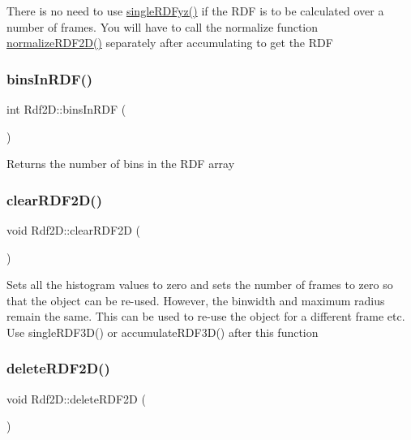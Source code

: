 There is no need to use \mbox{\hyperlink{classRdf2D_a4e77d415c344954480a121f79a4aab6b}{single\+R\+D\+Fyz()}} if the R\+DF is to be calculated over a number of frames. You will have to call the normalize function \mbox{\hyperlink{classRdf2D_aaf6d00ec728e8c694ed2932332691c0d}{normalize\+R\+D\+F2\+D()}} separately after accumulating to get the R\+DF \mbox{\label{classRdf2D_ad5d65146becc5d7703c783600d924f44}} 
\subsubsection{\texorpdfstring{bins\+In\+R\+D\+F()}{binsInRDF()}}
{\footnotesize\ttfamily int Rdf2\+D\+::bins\+In\+R\+DF (\begin{DoxyParamCaption}{ }\end{DoxyParamCaption})}

Returns the number of bins in the R\+DF array \mbox{\label{classRdf2D_a9658a9bb2229afda0d743bdc05a27411}} 
\subsubsection{\texorpdfstring{clear\+R\+D\+F2\+D()}{clearRDF2D()}}
{\footnotesize\ttfamily void Rdf2\+D\+::clear\+R\+D\+F2D (\begin{DoxyParamCaption}{ }\end{DoxyParamCaption})}

Sets all the histogram values to zero and sets the number of frames to zero so that the object can be re-\/used. However, the binwidth and maximum radius remain the same. This can be used to re-\/use the object for a different frame etc. Use single\+R\+D\+F3\+D() or accumulate\+R\+D\+F3\+D() after this function \mbox{\label{classRdf2D_a8008421c8aedff5887160b455879d36b}} 
\subsubsection{\texorpdfstring{delete\+R\+D\+F2\+D()}{deleteRDF2D()}}
{\footnotesize\ttfamily void Rdf2\+D\+::delete\+R\+D\+F2D (\begin{DoxyParamCaption}{ }\end{DoxyParamCaption})}

